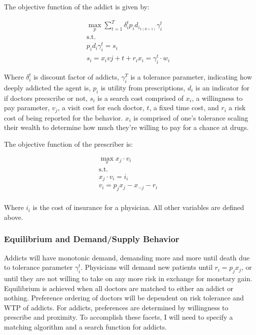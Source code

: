 \documentclass[11pt,a4paper]{article}
\begin{document}
The objective function of the addict is given by:

\begin{gather*}
  \max_p \sum\limits_{t=1}^{T} \delta^t_i p_id_i_{\mathbb{1}(d=1)}\gamma_i^t \\
  \text{s.t.} \\
  p_id_i\gamma_i^t = s_i \\
  s_i = x_ivj + t + r_i
  x_i = \gamma_i^t\cdot w_i
\end{gather*}

Where $\delta_i^t$ is discount factor of addicts, $\gamma_i^T$ is a tolerance parameter, indicating how deeply addicted the agent is, $p_i$ is utility from prescriptions, $d_i$ is an indicator for if doctors precscribe or not, 
$s_i$ is a search cost comprised of $x_i$, a willingness to pay parameter, $v_j$, a visit cost for each doctor, $t$, a fixed time cost, and $r_i$ a risk cost of being reported for the behavior. $x_i$ is comprised
of one's tolerance scaling their wealth to determine how much they're willing to pay for a chance at drugs.

The objective function of the prescriber is:

\begin{gather*}
  \max_x x_j\cdot v_i \\
  \text{s.t.} \\
  x_j\cdot v_i = i_i \\
  v_i = p_jx_j - x_{-j} - r_i \\
\end{gather*}

Where $i_i$ is the cost of insurance for a physician. All other variables are defined above. 

\subsubsection{Equilibrium and Demand/Supply Behavior}
\label{subsubsec:eq&behavior}

Addicts will have monotonic demand, demanding more and more until death due to tolerance parameter $\gamma_i^t$. Physicians will demand new patients until $r_i = p_jx_j$, or until they are not willing to take on any
more risk in exchange for monetary gain. Equilibrium is achieved when all doctors are matched to either an addict or nothing. Preference ordering of doctors will be dependent on risk tolerance and WTP of addicts.
For addicts, preferences are determined by willingness to prescribe and proximity. To accomplish these facets, I will need to specify a matching algorithm and a search function for addicts.
\end{document}
